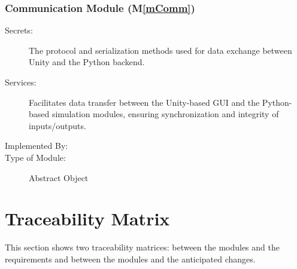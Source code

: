 \documentclass[12pt, titlepage]{article}
\newcommand{\mref}[1]{M\ref{#1}}
\begin{document}
\subsubsection{Communication Module (\mref{mComm})}

\begin{description}
\item[Secrets:] The protocol and serialization methods used for data exchange between Unity and the Python backend.
\item[Services:] Facilitates data transfer between the Unity-based GUI and the Python-based simulation modules, ensuring synchronization and integrity of inputs/outputs.
\item[Implemented By:] \progname{}
\item[Type of Module:] Abstract Object
\end{description}

\section{Traceability Matrix} \label{SecTM}

This section shows two traceability matrices: between the modules and the
requirements and between the modules and the anticipated changes.
\end{document}
